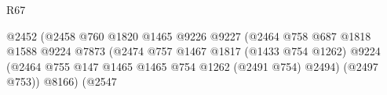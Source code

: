 \begin{lexlean}{R67}
\begin{coremodule}
                                                                      @2452
                                                                      (@2458
                                                                        @760
                                                                        @1820
                                                                        @1465
                                                                        @9226
                                                                        @9227
                                                                        (@2464
                                                                          @758
                                                                          @687
                                                                          @1818
                                                                          @1588
                                                                          @9224
                                                                          @7873
                                                                          (@2474
                                                                            @757
                                                                            @1467
                                                                            @1817
                                                                            (@1433 @754 @1262)
                                                                            @9224
                                                                            (@2464
                                                                              @755
                                                                              @147
                                                                              @1465
                                                                              @1465
                                                                              @754
                                                                              @1262
                                                                              (@2491 @754)
                                                                              @2494)
                                                                            (@2497 @753))
                                                                          @8166)
                                                                        (@2547

\end{coremodule}
\end{lexlean}

